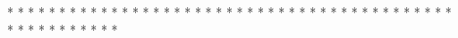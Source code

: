 * * *  * * *  * * *  *  * * *  *  * * *  * 
* * *  * * *  * * *  *  * * *  *  * * *  * 
* * *  * * *  * * *  *  * * *  *  * * *  * %
